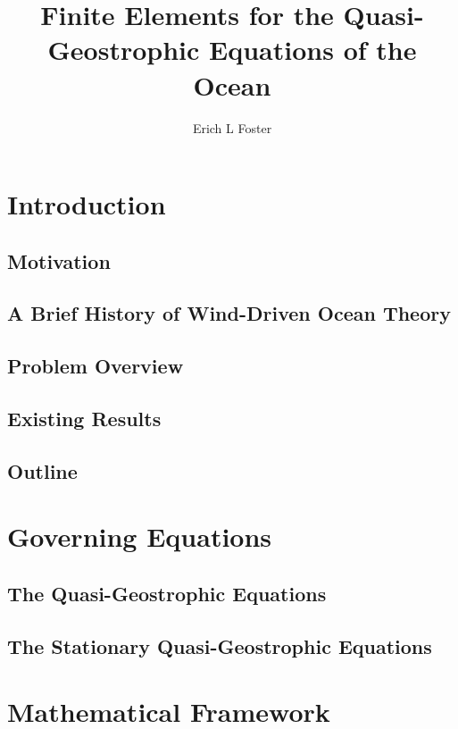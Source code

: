 \documentclass[12pt,doublespace]{VTthesis}
\title{
  Finite Elements for the Quasi-Geostrophic Equations of the Ocean
}
\author{Erich L Foster}
\begin{document}
  \frontmatter
  \maketitle
  \tableofcontents
  \listoftables
  \listoffigures

  \mainmatter

  \chapter{Introduction} \label{ch:Intro}
    \section{Motivation} \label{sec:Motivation}
    
    \section{A Brief History of Wind-Driven Ocean Theory}
    
    \section{Problem Overview}
    
    \section{Existing Results}
    
    \section{Outline}
    

  \chapter{Governing Equations} \label{ch:Model}
  
    \section{The Quasi-Geostrophic Equations} \label{sec:QGE}
    
    \section{The Stationary Quasi-Geostrophic Equations} \label{sec:SQGE}
    

  \chapter{Mathematical Framework} \label{ch:WellPosed}
  
\end{document}

